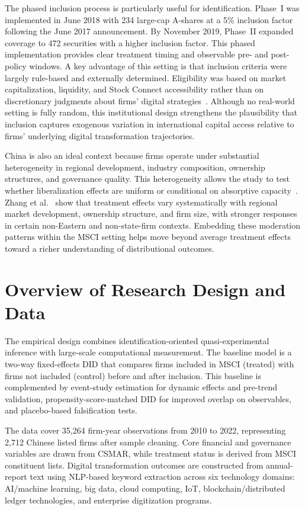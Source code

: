 The phased inclusion process is particularly useful for identification. Phase~I was implemented in June 2018 with 234 large-cap A-shares at a 5\% inclusion factor following the June 2017 announcement. By November 2019, Phase~II expanded coverage to 472 securities with a higher inclusion factor. This phased implementation provides clear treatment timing and observable pre- and post-policy windows. A key advantage of this setting is that inclusion criteria were largely rule-based and externally determined. Eligibility was based on market capitalization, liquidity, and Stock Connect accessibility rather than on discretionary judgments about firms' digital strategies~\cite{Yang2025}. Although no real-world setting is fully random, this institutional design strengthens the plausibility that inclusion captures exogenous variation in international capital access relative to firms' underlying digital transformation trajectories.

China is also an ideal context because firms operate under substantial heterogeneity in regional development, industry composition, ownership structures, and governance quality. This heterogeneity allows the study to test whether liberalization effects are uniform or conditional on absorptive capacity~\cite{Dong2023}. Zhang et al.~\cite{Zhang2024} show that treatment effects vary systematically with regional market development, ownership structure, and firm size, with stronger responses in certain non-Eastern and non-state-firm contexts. Embedding these moderation patterns within the MSCI setting helps move beyond average treatment effects toward a richer understanding of distributional outcomes.

\section{Overview of Research Design and Data}

The empirical design combines identification-oriented quasi-experimental inference with large-scale computational measurement. The baseline model is a two-way fixed-effects DID that compares firms included in MSCI (treated) with firms not included (control) before and after inclusion. This baseline is complemented by event-study estimation for dynamic effects and pre-trend validation, propensity-score-matched DID for improved overlap on observables, and placebo-based falsification tests.

The data cover 35,264 firm-year observations from 2010 to 2022, representing 2,712 Chinese listed firms after sample cleaning. Core financial and governance variables are drawn from CSMAR, while treatment status is derived from MSCI constituent lists. Digital transformation outcomes are constructed from annual-report text using NLP-based keyword extraction across six technology domains: AI/machine learning, big data, cloud computing, IoT, blockchain/distributed ledger technologies, and enterprise digitization programs.

